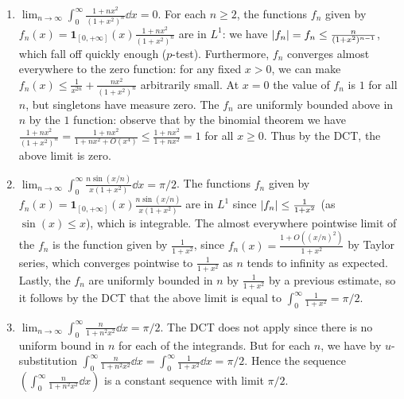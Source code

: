 \documentclass[11pt]{article}
\begin{document}
\begin{enumerate}
\begin{enumerate}
        \item $\displaystyle\lim_{n\to\infty}\int_0^\infty \frac{1+nx^2}{(1+x^2)^n}\dd x = 0$. For each $n\geq 2$, the functions $f_n$ given by $f_n(x) = \mathbf{1}_{[0,+\infty]}(x)\frac{1+nx^2}{(1+x^2)^n}$ are in $L^1$: we have $\abs{f_n} = f_n \leq \frac{n}{(1+x^2)^{n-1}}$, which fall off quickly enough ($p$-test). Furthermore, $f_n$ converges almost everywhere to the zero function: for any fixed $x> 0$, we can make $f_n(x)\leq \frac{1}{x^{2n}} + \frac{nx^2}{(1+x^2)^n}$ arbitrarily small. At $x= 0$ the value of $f_n$ is $1$ for all $n$, but singletons have measure zero. The $f_n$ are uniformly bounded above in $n$ by the $1$ function: observe that by the binomial theorem we have $\frac{1+nx^2}{(1+x^2)^n} = \frac{1+nx^2}{1+nx^2 + O(x^4)}\leq \frac{1+nx^2}{1+nx^2} = 1$ for all $x\geq 0$. Thus by the DCT, the above limit is zero.
        
        \item $\displaystyle\lim_{n\to\infty}\int_0^\infty \frac{n\sin(x/n)}{x(1+x^2)}\dd x = \pi/2$. The functions $f_n$ given by $f_n(x) = \mathbf{1}_{[0,+\infty]}(x)\frac{n\sin(x/n)}{x(1+x^2)}$ are in $L^1$ since $\abs{f_n}\leq \frac{1}{1+x^2}$ (as $\sin(x)\leq x$), which is integrable. The almost everywhere pointwise limit of the $f_n$ is the function given by $\frac{1}{1+x^2}$, since $f_n(x) = \frac{1 + O((x/n)^2)}{1+x^2}$ by Taylor series, which converges pointwise to $\frac{1}{1+x^2}$ as $n$ tends to infinity as expected. Lastly, the $f_n$ are uniformly bounded in $n$ by $\frac{1}{1+x^2}$ by a previous estimate, so it follows by the DCT that the above limit is equal to $\int_0^\infty \frac{1}{1+x^2} = \pi/2$.
        
        \item $\displaystyle\lim_{n\to\infty}\int_0^\infty \frac{n}{1+n^2x^2}\dd x = \pi/2$. The DCT does not apply since there is no uniform bound in $n$ for each of the integrands. But for each $n$, we have by $u$-substitution $\int_0^\infty \frac{n}{1+n^2x^2}\dd x = \int_0^\infty \frac{1}{1+x^2}\dd{x} = \pi/2$. Hence the sequence $\left(\int_0^\infty \frac{n}{1+n^2x^2}\dd x\right)$ is a constant sequence with limit $\pi/2$.
    \end{enumerate}
\end{enumerate}
\end{document}
